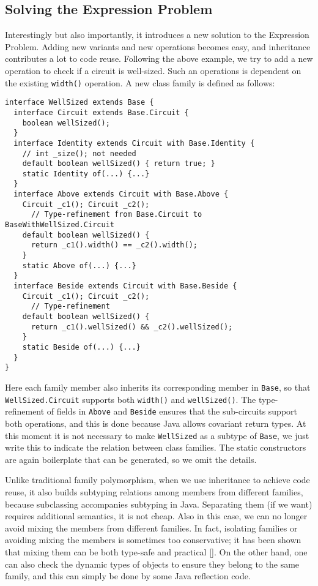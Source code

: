 \subsection{Solving the Expression Problem}

Interestingly but also importantly, it introduces a new solution to the Expression Problem. Adding new variants and new operations
becomes easy, and inheritance contributes a lot to code reuse. Following the above example, we try to add a new operation to check
if a circuit is well-sized. Such an operations is dependent on the existing \lstinline|width()| operation.
A new class family is defined as follows:

\begin{lstlisting}
interface WellSized extends Base {
  interface Circuit extends Base.Circuit {
    boolean wellSized();
  }
  interface Identity extends Circuit with Base.Identity {
    // int _size(); not needed
    default boolean wellSized() { return true; }
    static Identity of(...) {...}
  }
  interface Above extends Circuit with Base.Above {
    Circuit _c1(); Circuit _c2();
      // Type-refinement from Base.Circuit to BaseWithWellSized.Circuit
    default boolean wellSized() {
      return _c1().width() == _c2().width();
    }
    static Above of(...) {...}
  }
  interface Beside extends Circuit with Base.Beside {
    Circuit _c1(); Circuit _c2();
      // Type-refinement
    default boolean wellSized() {
      return _c1().wellSized() && _c2().wellSized();
    }
    static Beside of(...) {...}
  }
}
\end{lstlisting}
Here each family member also inherits its corresponding member in \lstinline|Base|, so that \lstinline|WellSized.Circuit|
supports both \lstinline|width()| and \lstinline|wellSized()|. The type-refinement of fields in \lstinline|Above| and \lstinline|Beside|
ensures that the sub-circuits support both operations, and this is done because Java allows covariant return types.
At this moment it is not necessary to make \lstinline|WellSized| as a subtype of
\lstinline|Base|, we just write this to indicate the relation between class families. The static constructors are again boilerplate
that can be generated, so we omit the details.

Unlike traditional family polymorphism, when we use inheritance to achieve code reuse, it also builds subtyping relations
among members from different families, because subclassing accompanies subtyping in Java. Separating them (if we want) requires
additional semantics, it is not cheap. Also in this case, we can no longer avoid mixing the members from different families.
In fact, isolating families or avoiding mixing the members is sometimes too conservative; it has been shown that mixing them can
be both type-safe and practical []. On the other hand, one can also check the dynamic types of objects to ensure they belong to
the same family, and this can simply be done by some Java reflection code.

